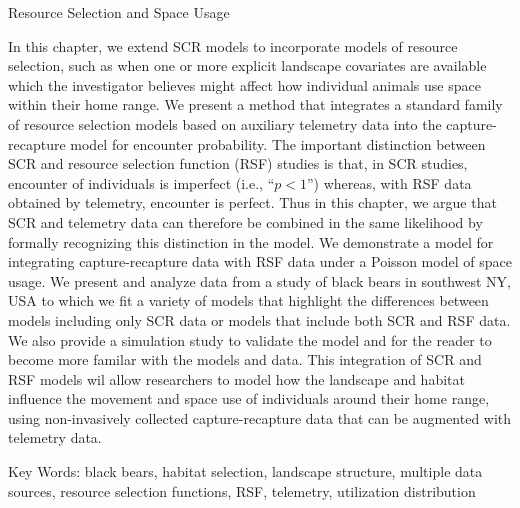 Resource Selection and Space Usage

 In this chapter, we extend SCR models to incorporate models of
resource selection, such as when one or more explicit landscape
covariates are available which the investigator believes might affect
how individual animals use space within their home range.  We present
a method that integrates a standard family of resource selection
models based on auxiliary telemetry data into the capture-recapture
model for encounter probability.  The important distinction between
SCR and resource selection function (RSF) studies is that, in SCR
studies, encounter of individuals is imperfect (i.e., ``$p<1$'')
whereas, with RSF data obtained by telemetry, encounter is perfect.
Thus in this chapter, we argue that SCR and telemetry data can
therefore be combined in the same likelihood by formally recognizing
this distinction in the model.  We demonstrate a model for integrating
capture-recapture data with RSF data under a Poisson model of space
usage.  We present and analyze data from a study of black bears in
southwest NY, USA to which we fit a variety of models that highlight
the differences between models including only SCR data or models that
include both SCR and RSF data.  We also provide a simulation study to
validate the model and for the reader to become more familar with the
models and data.  This integration of SCR and RSF models wil allow
researchers to model how the landscape and habitat influence the
movement and space use of individuals around their home range, using
non-invasively collected capture-recapture data that can be augmented
with telemetry data.

Key Words:  
black bears, 
habitat selection,
landscape structure, 
multiple data sources,
resource selection functions,
RSF,
telemetry,
utilization distribution

